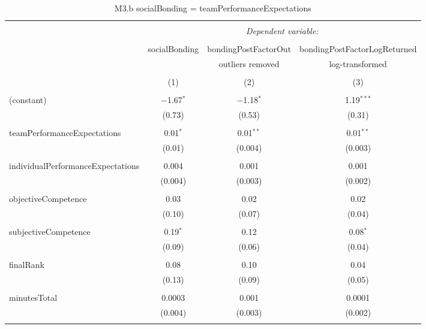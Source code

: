 
\begin{table}[!htbp] \centering 
  \caption{M3.b socialBonding = teamPerformanceExpectations} 
  \label{tab:MLM3bExpectationsBonding} 
\scriptsize 
\begin{tabular}{@{\extracolsep{5pt}}lccc} 
\\[-1.8ex]\hline 
\hline \\[-1.8ex] 
 & \multicolumn{3}{c}{\textit{Dependent variable:}} \\ 
\cline{2-4} 
\\[-1.8ex] & socialBonding & bondingPostFactorOut & bondingPostFactorLogReturned \\ 
 &  & outliers removed & log-transformed \\ 
\\[-1.8ex] & (1) & (2) & (3)\\ 
\hline \\[-1.8ex] 
 (constant) & $-$1.67$^{*}$ & $-$1.18$^{*}$ & 1.19$^{***}$ \\ 
  & (0.73) & (0.53) & (0.31) \\ 
  & & & \\ 
 teamPerformanceExpectations & 0.01$^{*}$ & 0.01$^{**}$ & 0.01$^{**}$ \\ 
  & (0.01) & (0.004) & (0.003) \\ 
  & & & \\ 
 individualPerformanceExpectations & 0.004 & 0.001 & 0.001 \\ 
  & (0.004) & (0.003) & (0.002) \\ 
  & & & \\ 
 objectiveCompetence & 0.03 & 0.02 & 0.02 \\ 
  & (0.10) & (0.07) & (0.04) \\ 
  & & & \\ 
 subjectiveCompetence & 0.19$^{*}$ & 0.12 & 0.08$^{*}$ \\ 
  & (0.09) & (0.06) & (0.04) \\ 
  & & & \\ 
 finalRank & 0.08 & 0.10 & 0.04 \\ 
  & (0.13) & (0.09) & (0.05) \\ 
  & & & \\ 
 minutesTotal & 0.0003 & 0.001 & 0.0001 \\ 
  & (0.004) & (0.003) & (0.002) \\ 
  & & & \\ 

\end{tabular}
\end{table}
